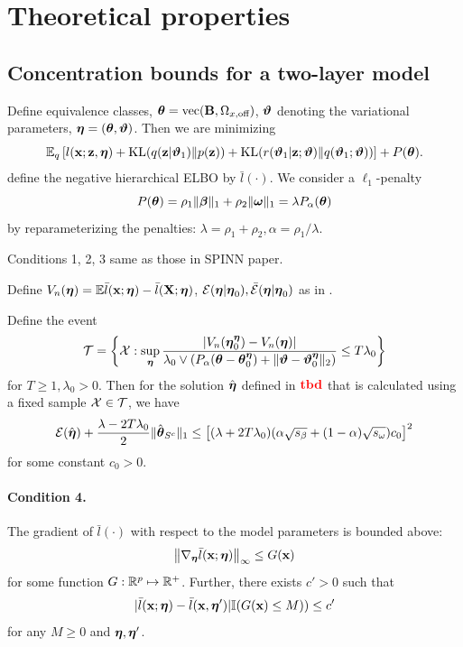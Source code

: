 \documentclass[11pt,letterpaper]{article}
\DeclareMathOperator*{\ve}{vec}
\DeclareMathOperator*{\kl}{\text{KL}}
\DeclareMathOperator*{\rtbd}{{\colrbf tbd}}
\numberwithin{equation}{section}
\begin{document}
\section{Theoretical properties}

\subsection{Concentration bounds for a two-layer model}
Define equivalence classes, $\bftheta = \ve (\bfB, \Omega_{x,\text{off}})$, ${\boldsymbol{\vartheta}}$ denoting the variational parameters, ${\boldsymbol{\eta}} = ({\boldsymbol{\theta}}, {\boldsymbol{\vartheta}})$. Then we are minimizing
%
$$
\BE_q \left[ l(\bfx; \bfz, \bfeta) + \kl(q(\bfz| \bfvt_1) \| p(\bfz)) +
\kl( r(\bfvt_1| \bfz; \bfvt) \| q(\bfvt_1; \bfvt)) \right] + P( \bftheta ).
$$
%
define the negative hierarchical ELBO by $\bar l(\cdot)$. We consider a $\ell_1$-penalty
%
$$ P({\boldsymbol{\theta}}) = \rho_1 \| {\boldsymbol{\beta}} \|_1 + \rho_2 \| {\boldsymbol{\omega}} \|_1 = \lambda P_\alpha ({\boldsymbol{\theta}}) $$
%
by reparameterizing the penalties: $ \lambda = \rho_1 + \rho_2, \alpha = \rho_1/\lambda$.

Conditions 1, 2, 3 same as those in SPINN paper.

Define $V_n({\boldsymbol{\eta}}) = {\mathbb{E}} \bar l({\bf{x}}; {\boldsymbol{\eta}}) - \bar l({\mathbf{X}}; {\boldsymbol{\eta}})$, ${\cal{E}}({\boldsymbol{\eta}}|{\boldsymbol{\eta}}_0), \bar {{\cal{E}}}({\boldsymbol{\eta}}|{\boldsymbol{\eta}}_0)$ as in \cite{StadlerEtal10}.

\begin{Theorem}\label{thm:thm1}
Define the event
%
$$
{\cal{T}} = \left\{ {\cal{X}}: \sup_{\boldsymbol{\eta}} \frac{ |V_n({\boldsymbol{\eta}}_0^{\boldsymbol{\eta}}) - V_n({\boldsymbol{\eta}})| }{\lambda_0 \vee
(P_\alpha({\boldsymbol{\theta}} - {\boldsymbol{\theta}}_0^{\boldsymbol{\eta}}) + \| {\boldsymbol{\vartheta}} - {\boldsymbol{\vartheta}}_0^{\boldsymbol{\eta}} \|_2) }
\leq T \lambda_0 \right\}
$$
%
for $T \geq 1, \lambda_0 > 0$. Then for the solution $\hat {{\boldsymbol{\eta}}}$ defined in $\rtbd$ that is calculated using a fixed sample ${\cal{X}} \in {\cal{T}}$, we have
%
$$
{\cal{E}}(\hat {{\boldsymbol{\eta}}} ) + \frac{\lambda - 2T\lambda_0}{2} \| \hat {{\boldsymbol{\theta}}}_{S^c} \|_1 \leq
\left[ (\lambda + 2T\lambda_0) (\alpha \sqrt{s_\beta} + (1-\alpha) \sqrt{s_\omega}) c_0 \right]^2
$$
%
for some constant $c_0 > 0$.
\end{Theorem}

\paragraph{Condition 4.} The gradient of $\bar l(\cdot)$ with respect to the model parameters is bounded above:
%
$$
\left\| \nabla_{\boldsymbol{\eta}} \bar l({\bf{x}}; {\boldsymbol{\eta}}) \right\|_\infty \leq G({\bf{x}})
$$
%
for some function $G: {\mathbb{R}}^p \mapsto {\mathbb{R}}^+$. Further, there exists $c' > 0$ such that
%
$$
| \bar l({\bf{x}}; {\boldsymbol{\eta}}) - \bar l({\bf{x}}, {\boldsymbol{\eta}}')| {\mathbb{I}}(G({\bf{x}}) \leq M)) \leq c'
$$
%
for any $M \geq 0$ and ${\boldsymbol{\eta}}, {\boldsymbol{\eta}}'$.
\end{document}
